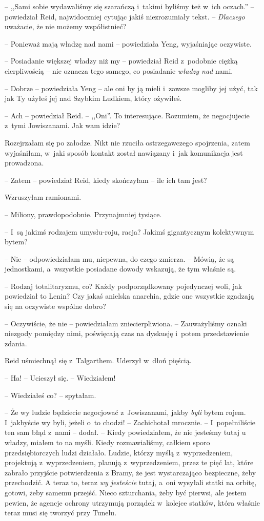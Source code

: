 \documentclass[oneside,polish,11pt,sfheadings]{mwbk}
\let\footnote=\endnote
\begin{document}
-- ,,Sami sobie wydawaliśmy się szarańczą i~takimi byliśmy też w~ich
oczach.''\footnote{ Biblia, Księga Liczb, 13,3 -- przyp.tłum.} -- powiedział
Reid, najwidoczniej cytując jakiś niezrozumiały tekst. -- \textit{Dlaczego}
uważacie, że nie możemy współistnieć?

-- Ponieważ mają władzę nad nami -- powiedziała Yeng, wyjaśniając
oczywiste.

-- Posiadanie większej władzy niż my -- powiedział Reid z~podobnie ciężką
cierpliwością -- nie oznacza tego samego, co posiadanie \textit{władzy nad}
nami.

-- Dobrze -- powiedziała Yeng -- ale oni by ją mieli i~zawsze mogliby jej użyć,
tak jak Ty użyłeś jej nad Szybkim Ludkiem, który ożywiłeś.

-- Ach -- powiedział Reid. -- ,,Oni''. To interesujące. Rozumiem, że
negocjujecie z~tymi Jowiszanami. Jak wam idzie?

Rozejrzałam się po załodze. Nikt nie rzuciła ostrzegawczego spojrzenia,
zatem wyjaśniłam, w~jaki sposób kontakt został nawiązany i~jak
komunikacja jest prowadzona.

-- Zatem -- powiedział Reid, kiedy skończyłam -- ile ich tam jest?

Wzruszyłam ramionami. 

-- Miliony, prawdopodobnie. Przynajmniej tysiące.

-- I~są jakimś rodzajem umysłu-roju, racja? Jakimś gigantycznym
kolektywnym bytem?

-- Nie -- odpowiedziałam mu, niepewna, do czego zmierza. -- Mówią, że są
jednostkami, a~wszystkie posiadane dowody wskazują, że tym właśnie są.

-- Rodzaj totalitaryzmu, co? Każdy podporządkowany pojedynczej woli, jak
powiedział to Lenin? Czy jakaś anielska anarchia, gdzie one wszystkie
zgadzają się na oczywiste wspólne dobro?

-- Oczywiście, że nie -- powiedziałam zniecierpliwiona. -- Zauważyliśmy
oznaki niezgody pomiędzy nimi, poświęcają czas na dyskusję i~potem
przedstawienie zdania.

Reid uśmiechnął się z~Talgarthem. Uderzył w~dłoń pięścią. 

-- Ha! -- Ucieszył się. -- Wiedziałem!

-- Wiedziałeś co? -- spytałam.

-- Że wy ludzie będziecie negocjować z~Jowiszanami, jakby \textit{byli}
bytem rojem. I~jakbyście wy byli, jeżeli o~to chodzi! -- Zachichotał
mrocznie. -- I~popełniliście ten sam błąd z~nami -- dodał. -- Kiedy
powiedziałem, że nie jesteśmy tutaj u władzy, miałem to na myśli. Kiedy
rozmawialiśmy, całkiem sporo przedsiębiorczych ludzi działało. Ludzie,
którzy myślą z~wyprzedzeniem, projektują z~wyprzedzeniem, planują z~wyprzedzeniem, przez te pięć lat, które zabrało przyjście potwierdzenia
z Bramy, że jest wystarczająco bezpieczne, żeby przechodzić. A teraz to,
teraz \textit{wy jesteście }tutaj, a~oni wysyłali statki na orbitę,
gotowi, żeby samemu przejść. Nieco szturchania, żeby być pierwsi, ale
jestem pewien, że agencje ochrony utrzymują porządek w~kolejce statków,
która właśnie teraz musi się tworzyć przy Tunelu.
\end{document}

